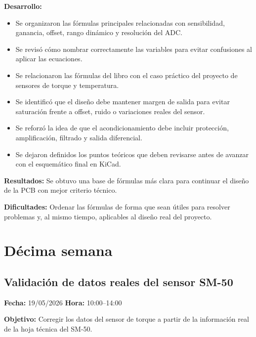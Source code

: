 \documentclass[12pt]{article}
\begin{document}
\textbf{Desarrollo:}
\begin{itemize}
\item Se organizaron las fórmulas principales relacionadas con sensibilidad, ganancia, offset, rango dinámico y resolución del ADC.
\item Se revisó cómo nombrar correctamente las variables para evitar confusiones al aplicar las ecuaciones.
\item Se relacionaron las fórmulas del libro con el caso práctico del proyecto de sensores de torque y temperatura.
\item Se identificó que el diseño debe mantener margen de salida para evitar saturación frente a offset, ruido o variaciones reales del sensor.
\item Se reforzó la idea de que el acondicionamiento debe incluir protección, amplificación, filtrado y salida diferencial.
\item Se dejaron definidos los puntos teóricos que deben revisarse antes de avanzar con el esquemático final en KiCad.
\end{itemize}

\textbf{Resultados:}
Se obtuvo una base de fórmulas más clara para continuar el diseño de la PCB con mejor criterio técnico.

\textbf{Dificultades:}
Ordenar las fórmulas de forma que sean útiles para resolver problemas y, al mismo tiempo, aplicables al diseño real del proyecto.



\section{Décima semana}

\subsection{Validación de datos reales del sensor SM-50}
\textbf{Fecha:} 19/05/2026 \quad \textbf{Hora:} 10:00--14:00

\textbf{Objetivo:}
Corregir los datos del sensor de torque a partir de la información real de la hoja técnica del SM-50.
\end{document}
